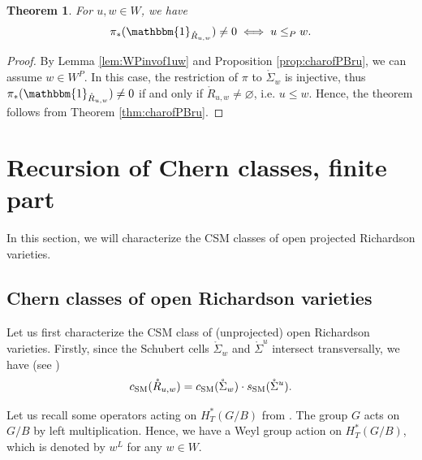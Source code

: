 \documentclass[12pt]{amsart}
\newtheorem{Th}{Theorem}[section]
\def\CSM{c_{\rm SM}}
\def\SSM{s_{\rm SM}}
\begin{document}
\begin{Th}\label{thm:geomcrit}
For $u, w\in W$, we have 
$$\pi_*(\mathbbm{1}_{\mathring{R}_{u,w}})\neq 0\iff u\leq_P w.$$
\end{Th}
\begin{proof}
By Lemma \ref{lem:WPinvof1uw} and Proposition \ref{prop:charofPBru}, we can assume $w\in W^P$. 
In this case, the restriction of $\pi$ to $\mathring{\Sigma}_w$ is injective, thus $\pi_*(\mathbbm{1}_{\mathring{R}_{u,w}})\neq 0$ if and only if $\mathring{R}_{u,w}\neq \varnothing$, i.e. $u\leq w$. 
Hence, the theorem follows from Theorem \ref{thm:charofPBru}. 
\end{proof}



\section{Recursion of Chern classes, finite part}\label{finitepart}

In this section, we will characterize the CSM classes of open projected Richardson varieties. 

\subsection{Chern classes of open Richardson varieties}\label{sec:csmRichard}
Let us first characterize the CSM class of (unprojected) open Richardson varieties.
Firstly, since the Schubert cells $\mathring{\Sigma}_w$ and $\mathring{\Sigma}^{u}$ intersect transversally, we have (see \cite{Sch17})
\begin{equation}
\label{eq:CSMR=CSMSSM}
\CSM(\mathring{R}_{u,w})=
\CSM(\mathring{\Sigma}_{w})\cdot \SSM(\mathring{\Sigma}^{u}).
\end{equation}

Let us recall some operators acting on $H_T^*(G/B)$ from \cite{MNS}. The group $G$ acts on $G/B$ by left multiplication. Hence, we have a Weyl group action on $H_T^*(G/B)$, which is denoted by $w^L$ for any $w\in W$. 
\end{document}
